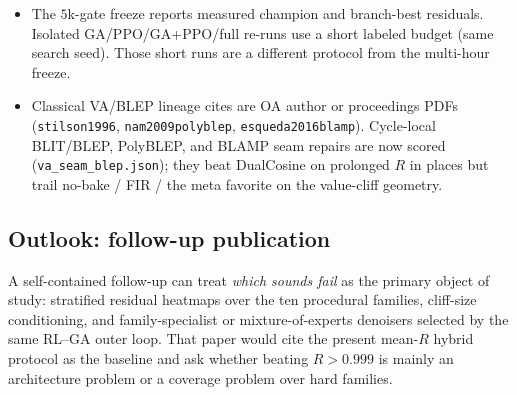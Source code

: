 \begin{itemize}
  \item The $5$k-gate freeze reports measured champion and branch-best residuals. Isolated GA/PPO/GA{+}PPO/full re-runs use a short labeled budget (same search seed). Those short runs are a different protocol from the multi-hour freeze.
  \item Classical VA/BLEP lineage cites are OA author or proceedings PDFs (\texttt{stilson1996}, \texttt{nam2009polyblep}, \texttt{esqueda2016blamp}). Cycle-local BLIT/BLEP, PolyBLEP, and BLAMP seam repairs are now scored (\texttt{va\_seam\_blep.json}); they beat DualCosine on prolonged $R$ in places but trail no-bake / FIR / the meta favorite on the value-cliff geometry.
\end{itemize}

\subsection{Outlook: follow-up publication}
\label{sec:outlook}

A self-contained follow-up can treat \emph{which sounds fail} as the primary object of study: stratified residual heatmaps over the ten procedural families, cliff-size conditioning, and family-specialist or mixture-of-experts denoisers selected by the same RL--GA outer loop.
That paper would cite the present mean-$R$ hybrid protocol as the baseline and ask whether beating $R>0.999$ is mainly an architecture problem or a coverage problem over hard families.
